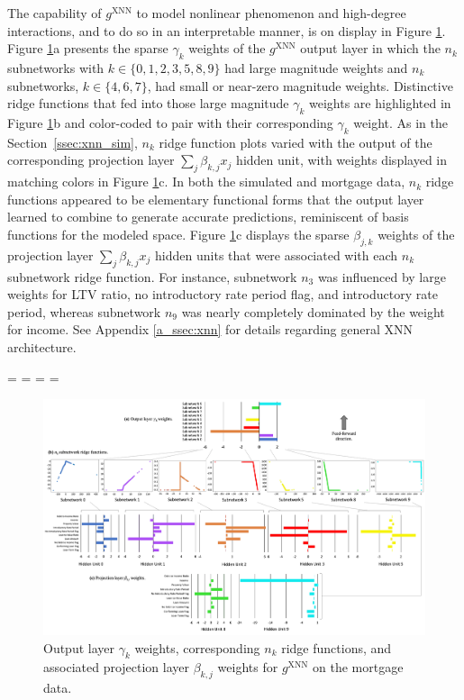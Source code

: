 \documentclass[information,article,accept,moreauthors,pdftex]{Definitions/mdpi}
\begin{document}
The capability of $g^\text{XNN}$ to model nonlinear phenomenon and high-degree interactions, and to do so in an interpretable manner, is on display in Figure \ref{fig:mort_xnn_glob_ridge}. Figure \ref{fig:mort_xnn_glob_ridge}{a} presents the sparse $\gamma_k$ weights of the $g^\text{XNN}$ output layer in which the $n_k$ subnetworks with $k \in \{0,1,2,3,5,8,9\}$ had large magnitude weights and $n_k$ subnetworks, $k \in \{4,6,7\}$, had small or near-zero magnitude weights. Distinctive ridge functions that fed into those large magnitude $\gamma_k$ weights are highlighted in Figure \ref{fig:mort_xnn_glob_ridge}{b} and color-coded to pair with their corresponding $\gamma_k$ weight. As in the Section~\ref{ssec:xnn_sim}, $n_k$ ridge function plots varied with the output of the corresponding projection layer $\sum_j\beta_{k,j}x_j$ hidden unit, with weights displayed in matching colors in Figure \ref{fig:mort_xnn_glob_ridge}{c}. In both the simulated and mortgage data, $n_k$ ridge functions appeared to be elementary functional forms that the output layer learned to combine to generate accurate predictions, reminiscent of basis functions for the modeled space. Figure \ref{fig:mort_xnn_glob_ridge}{c} displays the sparse $\beta_{j,k}$ weights of the projection layer $\sum_j\beta_{k,j}x_j$ hidden units that were associated with each $n_k$ subnetwork ridge function. For instance, subnetwork $n_3$ was influenced by large weights for LTV ratio, no introductory rate period flag, and introductory rate period, whereas subnetwork $n_9$ was nearly completely dominated by the weight for income. See Appendix \ref{a_ssec:xnn} for details regarding general XNN architecture.

\newpage
\paperwidth=\pdfpageheight
\paperheight=\pdfpagewidth
\pdfpageheight=\paperheight
\pdfpagewidth=\paperwidth
{}
\fancyheadoffset[LO,RE]{0cm}
\fancyheadoffset[RO,LE]{0cm}

\begin{figure}[H]
\includegraphics[width=23cm]{img/mort_xnn_glob_ridge.png}
\caption{Output layer $\gamma_k$ weights, corresponding $n_k$ ridge functions, and associated projection layer $\beta_{k,j}$ weights for $g^\text{XNN}$ on the mortgage data.}
\label{fig:mort_xnn_glob_ridge}
\end{figure} 
\end{document}

